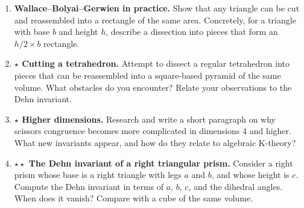 \begin{enumerate}
    \item \textbf{Wallace--Bolyai--Gerwien in practice.} Show that any triangle can be cut and reassembled into a rectangle of the same area. Concretely, for a triangle with base $b$ and height $h$, describe a dissection into pieces that form an $h/2 \times b$ rectangle.

    \item \textbf{$\star$ Cutting a tetrahedron.} Attempt to dissect a regular tetrahedron into pieces that can be reassembled into a square-based pyramid of the same volume. What obstacles do you encounter? Relate your observations to the Dehn invariant.

    \item \textbf{$\star$ Higher dimensions.} Research and write a short paragraph on why scissors congruence becomes more complicated in dimensions 4 and higher. What new invariants appear, and how do they relate to algebraic K-theory?

    \item \textbf{$\star\star$ The Dehn invariant of a right triangular prism.} Consider a right prism whose base is a right triangle with legs $a$ and $b$, and whose height is $c$. Compute the Dehn invariant in terms of $a$, $b$, $c$, and the dihedral angles. When does it vanish? Compare with a cube of the same volume.

\end{enumerate}
